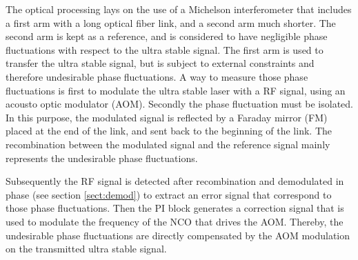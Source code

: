 \documentclass[12pt,oneside]{article}
\begin{document}

\vspace{0.5cm}
The optical processing lays on the use of a Michelson interferometer that includes a first arm with a long optical fiber link, and a second arm much shorter. The second arm is kept as a reference, and is considered to have negligible phase fluctuations with respect to the ultra stable signal. The first arm is used to transfer the ultra stable signal, but is subject to external constraints and therefore undesirable phase fluctuations. A way to measure those phase fluctuations is first to modulate the ultra stable laser with a RF signal, using an acousto optic modulator (AOM). Secondly the phase fluctuation must be isolated. In this purpose, the modulated signal is reflected by a Faraday mirror (FM) placed at the end of the link, and sent back to the beginning of the link. The recombination between the modulated signal and the reference signal mainly represents the undesirable phase fluctuations. 

Subsequently the RF signal is detected after recombination and demodulated in phase (see section \ref{sect:demod}) to extract an error signal that correspond to those phase fluctuations. Then the PI block generates a correction signal that is used to modulate the frequency of the NCO that drives the AOM. Thereby, the undesirable phase fluctuations are directly compensated by the AOM modulation on the transmitted ultra stable signal. 
\end{document}
